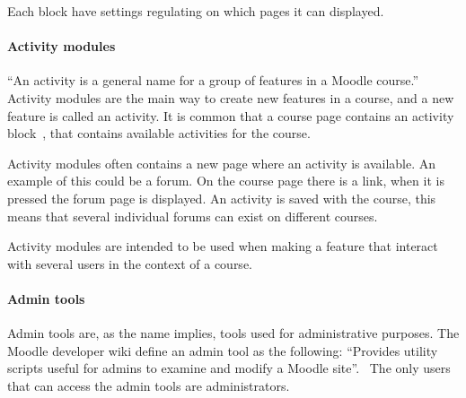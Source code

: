 Each block have settings regulating on which pages it can displayed. %




\paragraph{Activity modules}
``An activity is a general name for a group of features in a Moodle course.''~\cite{activity} 
Activity modules are the main way to create new features in a course, and a new feature is called an activity. 
It is common that a course page contains an activity block~\cite{activityblock}, that contains available activities for the course. 

Activity modules often contains a new page where an activity is available. 
An example of this could be a forum. 
On the course page there is a link, when it is pressed the forum page is displayed. 
An activity is saved with the course, this means that several individual forums can exist on different courses.

Activity modules are intended to be used when making a feature that interact with several users in the context of a course.  

\paragraph{Admin tools}
Admin tools are, as the name implies, tools used for administrative purposes. 
The Moodle developer wiki define an admin tool as the following: 
``Provides utility scripts useful for admins to examine and modify a Moodle site''.~\cite{plugin} 
The only users that can access the admin tools are administrators. 

